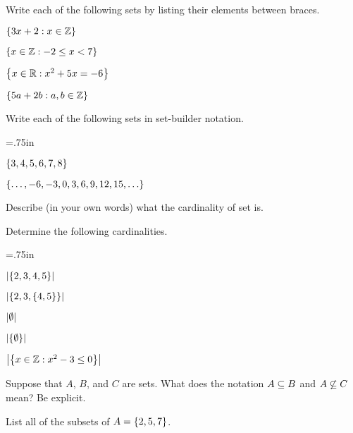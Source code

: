 \begin{question}
\item Write each of the following sets by listing their elements between braces.	
	\begin{qpart} \itemsep=1.2in
	\item $\left\{3x+2 : x \in \mathbb{Z}\right\}$
	\item $\left\{x \in \mathbb{Z} : -2 \leq x < 7\right\}$
	\item $\left\{x \in \mathbb{R} : x^2 + 5x = -6\right\}$
	\item $\left\{5a+2b : a,b \in \mathbb{Z}\right\}$
	\vspace{1.2in}
	\end{qpart} 
	
\item Write each of the following sets in set-builder notation.
	\begin{qpart} \itemsep=.75in
	\item $\left\{3,4,5,6,7,8\right\}$
	\item $\left\{ \ldots, -6, -3, 0, 3, 6, 9, 12, 15, \ldots \right\}$
	\vspace{.75in}
	\end{qpart}
	
\item Describe (in your own words) what the cardinality of set is.

\vspace{.5in}
	
\item Determine the following cardinalities.
	\begin{qpart} \itemsep=.75in
	\item $\left| \left\{2,3,4,5\right\} \right|$
	\item $\left| \left\{2,3,\left\{4,5\right\}\right\} \right|$
	\item $\left| \emptyset \right|$
	\item $\left| \left\{\emptyset\right\} \right|$
	\item $\left| \left\{x \in \mathbb{Z} : x^2-3 \leq 0\right\} \right|$
	\vspace{.75in}
	\end{qpart}
	
\item \begin{qpart}
	\item Suppose that $A$, $B$, and $C$ are sets.  What does the notation $A \subseteq B$ and $A \not\subseteq C$ mean?  Be explicit.
	\vspace{2in}
	\item List all of the subsets of $A=\left\{2,5,7\right\}$.
	
	\vspace{1in}
	
	\end{qpart}
\end{question}

